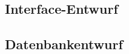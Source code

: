 







\subsection{Interface-Entwurf}\label{Interface-Entwurf}
\subsection{Datenbankentwurf}\label{Datenbankentwurf}





